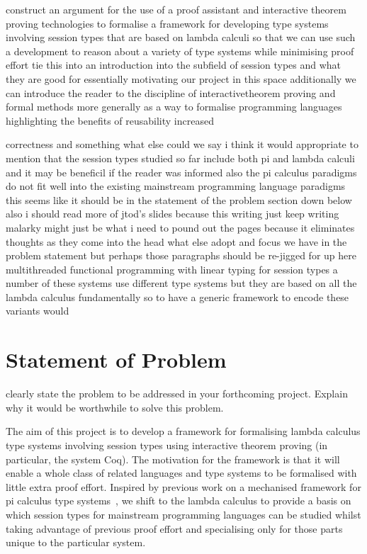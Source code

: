 \documentclass{mprop}
\begin{document}
construct an argument for the use of a proof assistant and interactive theorem proving technologies to formalise a framework for developing type systems involving session types that are based on lambda calculi so that we can use such a development to reason about a variety of type systems while minimising proof effort tie this into an introduction into the subfield of session types and what they are good for essentially motivating our project in this space additionally we can introduce the reader to the discipline of interactivetheorem proving and formal methods more generally as a way to formalise programming languages highlighting the benefits of reusability increased

correctness and something what else could we say i think it would appropriate
to mention that the session types studied so far include both pi and lambda
calculi and it may be beneficil if the reader was informed also the pi
calculus paradigms do not fit well into the existing mainstream programming
language paradigms this seems like it should be in the statement of the problem section down below also i should read more of jtod's slides because this writing just keep writing malarky might just be what i need to pound out the pages because it eliminates thoughts as they come into the head what else adopt and focus we have in the problem statement but perhaps those paragraphs should be re-jigged for up here multithreaded functional programming with linear typing for session types a number of these systems use different type systems but they are based on all the lambda calculus fundamentally so to have a generic framework to encode these variants would 

\section{Statement of Problem}

clearly state the problem to be addressed in your forthcoming project. Explain
why it would be worthwhile to solve this problem.

The aim of this project is to develop a framework for formalising lambda
calculus type systems involving session types using interactive theorem
proving (in particular, the system Coq). The motivation for the framework is
that it will enable a whole class of related languages and type systems to be
formalised with little extra proof effort. Inspired by previous work on a
mechanised framework for pi calculus type systems~\cite{Gay:2001:FFP}, we
shift to the lambda calculus to provide a basis on which session types for
mainstream programming languages can be studied whilst taking advantage of
previous proof effort and specialising only for those parts unique to the
particular system.
\end{document}
